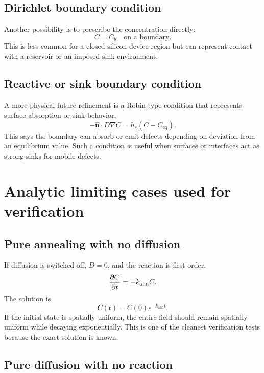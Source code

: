 \documentclass[11pt]{article}
\begin{document}
\subsection{Dirichlet boundary condition}

Another possibility is to prescribe the concentration directly:
\begin{equation}
C = C_b \quad \text{on a boundary.}
\end{equation}
This is less common for a closed silicon device region but can represent contact with a reservoir or an imposed sink environment.

\subsection{Reactive or sink boundary condition}

A more physical future refinement is a Robin-type condition that represents surface absorption or sink behavior,
\begin{equation}
-\hat{\mathbf{n}}\cdot D\nabla C = h_s (C - C_{\mathrm{eq}}).
\end{equation}
This says the boundary can absorb or emit defects depending on deviation from an equilibrium value. Such a condition is useful when surfaces or interfaces act as strong sinks for mobile defects.

\section{Analytic limiting cases used for verification}

\subsection{Pure annealing with no diffusion}

If diffusion is switched off, $D=0$, and the reaction is first-order,
\begin{equation}
\pdv{C}{t} = -k_{\mathrm{ann}} C.
\end{equation}
The solution is
\begin{equation}
C(t) = C(0)e^{-k_{\mathrm{ann}} t}.
\end{equation}
If the initial state is spatially uniform, the entire field should remain spatially uniform while decaying exponentially. This is one of the cleanest verification tests because the exact solution is known.

\subsection{Pure diffusion with no reaction}
\end{document}
